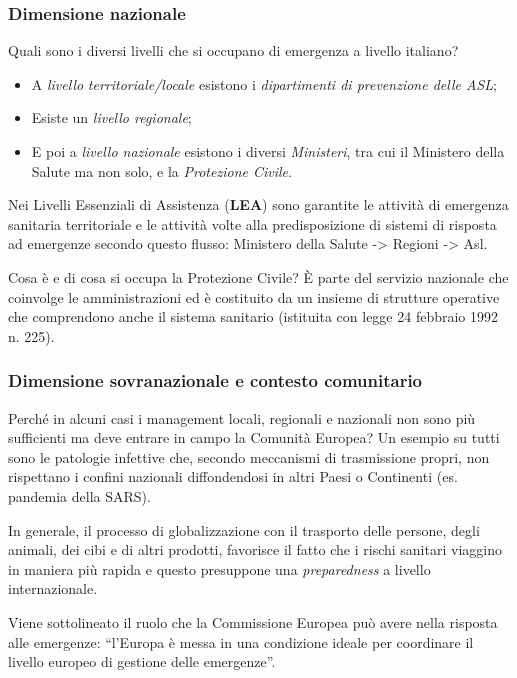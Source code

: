 \subsubsection{Dimensione nazionale}

Quali sono i diversi livelli che si occupano di emergenza a livello
italiano?

\begin{itemize}
\item
  A \emph{livello} \emph{territoriale/locale} esistono i
  \emph{dipartimenti di prevenzione delle ASL};
\item
  Esiste un \emph{livello regionale};
\item
  E poi a \emph{livello nazionale} esistono i diversi \emph{Ministeri},
  tra cui il Ministero della Salute ma non solo, e la \emph{Protezione
  Civile}.
\end{itemize}

Nei Livelli Essenziali di Assistenza (\textbf{LEA}) sono garantite le
attività di emergenza sanitaria territoriale e le attività volte alla
predisposizione di sistemi di risposta ad emergenze secondo questo
flusso: Ministero della Salute -> Regioni -> Asl.

Cosa è e di cosa si occupa la Protezione Civile? È parte del servizio
nazionale che coinvolge le amministrazioni ed è costituito da un insieme
di strutture operative che comprendono anche il sistema sanitario
(istituita con legge 24 febbraio 1992 n. 225).

\subsubsection{Dimensione sovranazionale e contesto comunitario}

Perché in alcuni casi i management locali, regionali e nazionali non
sono più sufficienti ma deve entrare in campo la Comunità Europea? Un
esempio su tutti sono le patologie infettive che, secondo meccanismi di
trasmissione propri, non rispettano i confini nazionali diffondendosi in
altri Paesi o Continenti (es. pandemia della SARS).

In generale, il processo di globalizzazione con il trasporto delle
persone, degli animali, dei cibi e di altri prodotti, favorisce il fatto
che i rischi sanitari viaggino in maniera più rapida e questo presuppone
una \emph{preparedness} a livello internazionale.

Viene sottolineato il ruolo che la Commissione Europea può avere nella
risposta alle emergenze: ``l'Europa è messa in una condizione ideale per
coordinare il livello europeo di gestione delle emergenze''.

